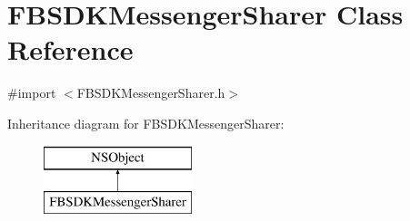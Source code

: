 \hypertarget{interface_f_b_s_d_k_messenger_sharer}{}\section{F\+B\+S\+D\+K\+Messenger\+Sharer Class Reference}
\label{interface_f_b_s_d_k_messenger_sharer}


{\ttfamily \#import $<$F\+B\+S\+D\+K\+Messenger\+Sharer.\+h$>$}

Inheritance diagram for F\+B\+S\+D\+K\+Messenger\+Sharer\+:\begin{figure}[H]
\begin{center}
\leavevmode
\includegraphics[height=2.000000cm]{interface_f_b_s_d_k_messenger_sharer}
\end{center}
\end{figure}
